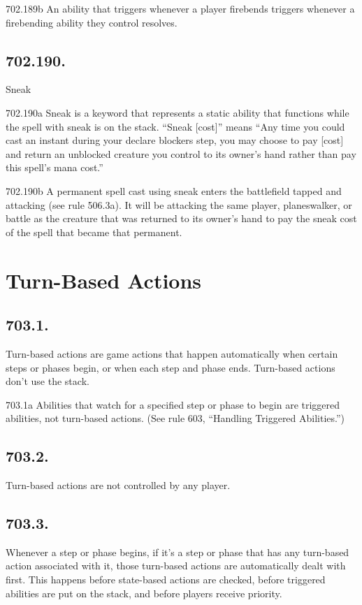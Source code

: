702.189b An ability that triggers whenever a player firebends triggers whenever a firebending ability they control resolves.

\subsection*{702.190.}
Sneak

702.190a Sneak is a keyword that represents a static ability that functions while the spell with sneak is on the stack. “Sneak [cost]” means “Any time you could cast an instant during your declare blockers step, you may choose to pay [cost] and return an unblocked creature you control to its owner’s hand rather than pay this spell’s mana cost.”

702.190b A permanent spell cast using sneak enters the battlefield tapped and attacking (see rule 506.3a). It will be attacking the same player, planeswalker, or battle as the creature that was returned to its owner’s hand to pay the sneak cost of the spell that became that permanent.

\section{Turn-Based Actions}
\subsection*{703.1.}
Turn-based actions are game actions that happen automatically when certain steps or phases begin, or when each step and phase ends. Turn-based actions don’t use the stack.

703.1a Abilities that watch for a specified step or phase to begin are triggered abilities, not turn-based actions. (See rule 603, “Handling Triggered Abilities.”)

\subsection*{703.2.}
Turn-based actions are not controlled by any player.

\subsection*{703.3.}
Whenever a step or phase begins, if it’s a step or phase that has any turn-based action associated with it, those turn-based actions are automatically dealt with first. This happens before state-based actions are checked, before triggered abilities are put on the stack, and before players receive priority.

